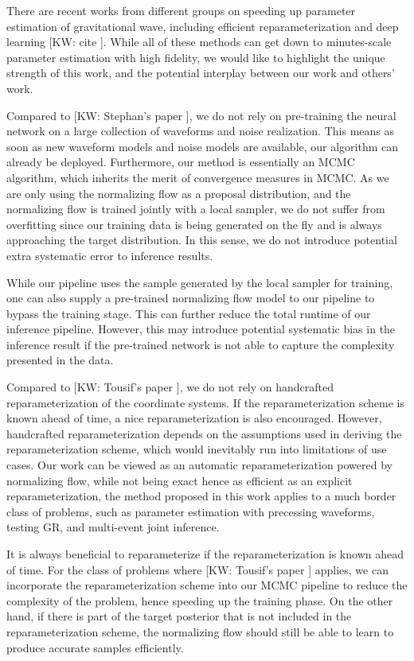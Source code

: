 \documentclass[twocolumn]{aastex631}
\newcommand{\kw}[1]{{\color{rb4}[KW: #1 ]}}
\begin{document}
There are recent works from different groups on speeding up parameter estimation
of gravitational wave, including efficient reparameterization and deep learning
\kw{cite}. While all of these methods can get down to minutes-scale parameter
estimation with high fidelity, we would like to highlight the unique strength of
this work, and the potential interplay between our work and others' work.

Compared to \kw{Stephan's paper}, we do not rely on pre-training the neural
network on a large collection of waveforms and noise realization. This means as
soon as new waveform models and noise models are available, our algorithm can
already be deployed. Furthermore, our method is essentially an MCMC algorithm,
which inherits the merit of convergence measures in MCMC. As we are only using
the normalizing flow as a proposal distribution, and the normalizing flow is
trained jointly with a local sampler, we do not suffer from overfitting since
our training data is being generated on the fly and is always approaching the
target distribution. In this sense, we do not introduce potential extra
systematic error to inference results.

While our pipeline uses the sample generated by the local sampler for training,
one can also supply a pre-trained normalizing flow model to our pipeline to
bypass the training stage. This can further reduce the total runtime of our
inference pipeline. However, this may introduce potential systematic bias in the
inference result if the pre-trained network is not able to capture the
complexity presented in the data.

Compared to \kw{Tousif's paper}, we do not rely on handcrafted
reparameterization of the coordinate systems. If the reparameterization scheme
is known ahead of time, a nice reparameterization is also encouraged. However,
handcrafted reparameterization depends on the assumptions used in deriving the
reparameterization scheme, which would inevitably run into limitations of use
cases. Our work can be viewed as an automatic reparameterization powered by
normalizing flow, while not being exact hence as efficient as an explicit
reparameterization, the method proposed in this work applies to a much
border class of problems, such as parameter estimation with precessing
waveforms, testing GR, and multi-event joint inference.

It is always beneficial to reparameterize if the reparameterization is known
ahead of time. For the class of problems where \kw{Tousif's paper} applies, we
can incorporate the reparameterization scheme into our MCMC pipeline to reduce
the complexity of the problem, hence speeding up the training phase. On the
other hand, if there is part of the target posterior that is not included in the
reparameterization scheme, the normalizing flow should still be able to learn to
produce accurate samples efficiently.
\end{document}
